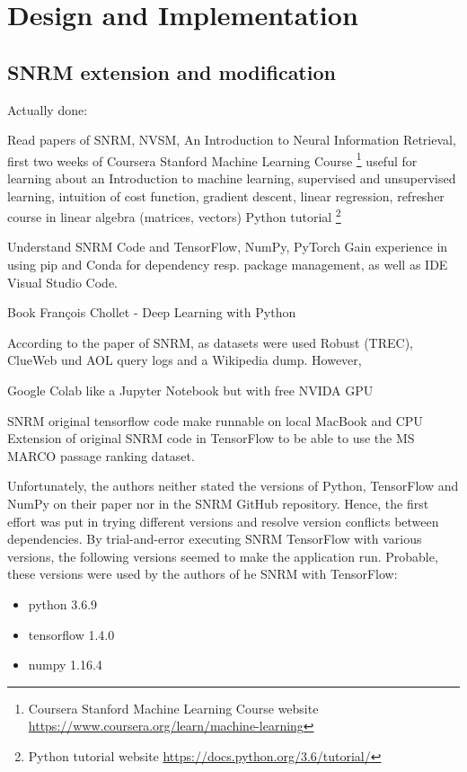 \chapter{Design and Implementation}


\section{SNRM extension and modification}
Actually done:

Read papers of SNRM, NVSM, An Introduction to Neural Information Retrieval,
first two weeks of Coursera Stanford Machine Learning Course \footnote{Coursera Stanford Machine Learning Course website \url{https://www.coursera.org/learn/machine-learning}}
useful for learning about an Introduction to machine learning, supervised and unsupervised learning, intuition of
cost function, gradient descent, linear regression, refresher course in linear algebra (matrices, vectors)
Python tutorial \footnote{Python tutorial website \url{https://docs.python.org/3.6/tutorial/}}

Understand SNRM Code and TensorFlow, NumPy, PyTorch
Gain experience in using pip and Conda for dependency resp. package management, as well as IDE Visual Studio Code.


Book François Chollet - Deep Learning with Python

According to the paper of SNRM, as datasets were used Robust (TREC), ClueWeb und AOL query logs and a Wikipedia dump.
However, 



Google Colab like a Jupyter Notebook but with free NVIDA GPU

SNRM original tensorflow code make runnable on local MacBook and CPU
Extension of original SNRM code in TensorFlow to be able to use the MS MARCO passage ranking dataset.

Unfortunately, the authors neither stated the versions of Python, TensorFlow and NumPy on their paper nor in the SNRM GitHub repository.
Hence, the first effort was put in trying different versions and resolve version conflicts between dependencies.
By trial-and-error executing SNRM TensorFlow with various versions, the following versions seemed to make the application run.
Probable, these versions were used by the authors of he SNRM with TensorFlow:

\begin{itemize}
    \item python 3.6.9
    \item tensorflow 1.4.0
    \item numpy 1.16.4
\end{itemize}

